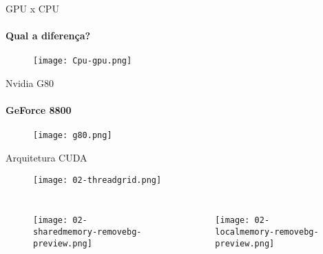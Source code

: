 \begin{frame}[t]{GPU x CPU}
    \framesubtitle{Qual a diferença?}
    \begin{figure}
        \texttt{[image: Cpu-gpu.png]}
    \end{figure}

\end{frame}
\begin{frame}[t]{Nvidia G80}
    \framesubtitle{GeForce 8800}
    \begin{figure}
        \texttt{[image: g80.png]}
    \end{figure}

\end{frame}
\begin{frame}[t]{Arquitetura CUDA}
    \begin{figure}
        \texttt{[image: 02-threadgrid.png]}
    \end{figure}
    \begin{columns}
            \begin{figure}
               \texttt{[image: 02-sharedmemory-removebg-preview.png]}
            \end{figure}
        
            \begin{figure}
               \texttt{[image: 02-localmemory-removebg-preview.png]}
            \end{figure}
    \end{columns}
\end{frame}
